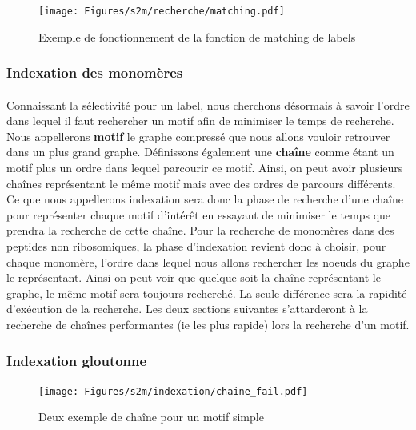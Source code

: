 \documentclass[12pt,french,twoside]{report}
\begin{document}
\begin{figure}
  \texttt{[image: Figures/s2m/recherche/matching.pdf]}
  \caption{\label{label_matching}Exemple de fonctionnement de la fonction de matching de labels}
\end{figure}

\subsubsection{Indexation des monomères}

\label{index_p}

\paragraph{}Connaissant la sélectivité pour un label, nous cherchons désormais à savoir l'ordre dans lequel il faut rechercher
un motif afin de minimiser le temps de recherche.
Nous appellerons \textbf{motif} le graphe compressé que nous allons vouloir retrouver dans un plus
grand graphe. Définissons également une \textbf{chaîne} comme étant un motif plus un ordre dans lequel parcourir ce motif. Ainsi,
on peut avoir plusieurs chaînes représentant le même motif mais avec des ordres de parcours différents. Ce que nous appellerons
indexation sera donc la phase de recherche d'une chaîne pour représenter chaque motif d'intérêt en essayant de minimiser le temps
que prendra la recherche de cette chaîne. Pour la recherche de monomères dans
des peptides non ribosomiques, la phase d'indexation revient donc à choisir, pour chaque monomère, l'ordre dans lequel nous allons
rechercher les noeuds du graphe le représentant. Ainsi on peut voir que quelque soit la chaîne représentant le graphe, le même
motif sera toujours recherché. La seule différence sera la rapidité d'exécution de la recherche. Les deux sections suivantes
s'attarderont à la recherche de chaînes performantes (ie les plus rapide) lors la recherche d'un motif.


\subsubsection{Indexation gloutonne}

\begin{figure}
  \texttt{[image: Figures/s2m/indexation/chaine\_fail.pdf]}
  \caption{\label{chaine_fail}Deux exemple de chaîne pour un motif simple}
\end{figure}
\end{document}
